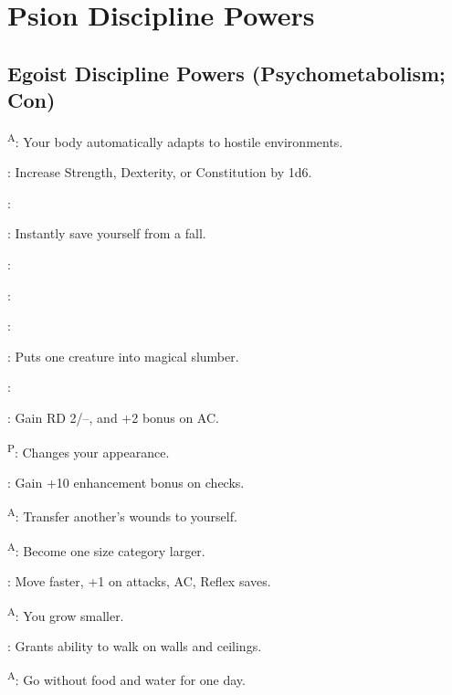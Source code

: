 \section{Psion Discipline Powers}



\subsection{Egoist Discipline Powers {\normalsize(Psychometabolism; Con)}}
\begin{enumerate*}
\item {}\textsuperscript{A}: Your body automatically adapts to hostile environments.

      : Increase Strength, Dexterity, or Constitution by 1d6.

      :

      : Instantly save yourself from a fall. %

      :

      :

      :

      : Puts one creature into magical slumber.

\item {}:

      : Gain RD 2/--, and +2 bonus on AC.

      \textsuperscript{P}: Changes your appearance.

      : Gain +10 enhancement bonus on  checks. %

      \textsuperscript{A}: Transfer another's wounds to yourself. %

      \textsuperscript{A}: Become one size category larger. %

      : Move faster, +1 on attacks, AC, Reflex saves.

      \textsuperscript{A}: You grow smaller. %

      : Grants ability to walk on walls and ceilings.

      \textsuperscript{A}: Go without food and water for one day. %


\end{enumerate*}
